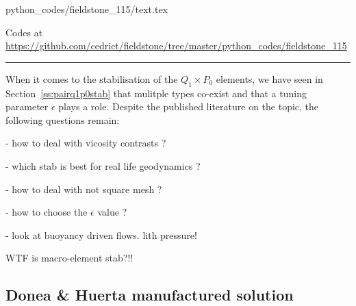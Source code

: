 \begin{flushright} {\tiny {\color{gray} python\_codes/fieldstone\_115/text.tex}} \end{flushright}



\begin{center}
Codes at \url{https://github.com/cedrict/fieldstone/tree/master/python_codes/fieldstone_115}
\end{center}

\par\noindent\rule{\textwidth}{0.4pt}



When it comes to the stabilisation of the $Q_1\times P_0$ elements, 
we have seen in Section~\ref{ss:pairq1p0stab} that mulitple types co-exist
and that a tuning parameter $\epsilon$ plays a role. 
Despite the published literature on the topic, the following questions remain:

- how to deal with vicosity contrasts ? 

- which stab is best for real life geodynamics ? 

- how to deal with not square mesh ?

- how to choose the $\epsilon$ value ?

- look at buoyancy driven flows. lith pressure!

WTF is macro-element stab?!!


\subsection{Donea \& Huerta manufactured solution}


